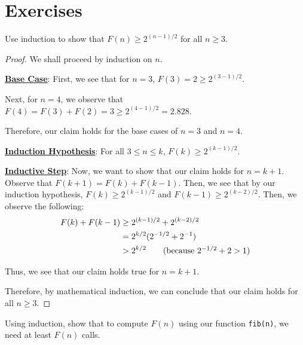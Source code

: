 \documentclass[openany]{book}
\begin{document}
\section{Exercises}
\begin{hw}
	Use induction to show that $F(n) \geq 2^{(n-1)/2}$ for all $n \geq 3$.
\end{hw}
\begin{proof}
	We shall proceed by induction on $n$.
	
	\underline{\textbf{Base Case}}: First, we see that for $n=3$, $F(3) = 2 \geq 2^{(3-1)/2}$. 
	
	Next, for $n=4$, we observe that $F(4)=F(3)+F(2)=3 \geq 2^{(4-1)/2} = 2.828$.
	
	Therefore, our claim holds for the base cases of $n=3$ and $n=4$.
	
	\underline{\textbf{Induction Hypothesis}}: For all $3 \leq n \leq k$, $F(k)\geq 2^{(k-1)/2}$. 
	
	\underline{\textbf{Inductive Step}}: Now, we want to show that our claim holds for $n=k+1$. Observe that $F(k+1) = F(k) + F(k-1)$. Then, we see that by our induction hypothesis, $F(k) \geq 2^{(k-1)/2}$ and $F(k-1) \geq 2^{(k-2)/2}$. Then, we observe the following:
	\begin{align*}
		F(k) + F(k-1) &\geq 2^{(k-1)/2} + 2^{(k-2)/2} \\
		&= 2^{k/2}(2^{-1/2} + 2^{-1}) \\
		&> 2^{k/2} \tag{because $2^{-1/2}+2 > 1$}
	\end{align*}
	
	Thus, we see that our claim holds true for $n=k+1$.
	
	Therefore, by mathematical induction, we can conclude that our claim holds for all $n \geq 3$.
\end{proof}
\begin{hw}
	Using induction, show that to compute $F(n)$ using our function \lstinline[language=Python]|fib(n)|, we need at least $F(n)$ calls.
\end{hw}
\end{document}
